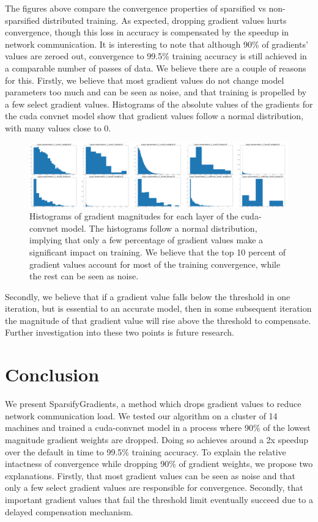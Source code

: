 \documentclass[10pt]{article}
\begin{document}
\noindent The figures above compare the convergence properties of
sparsified vs non-sparsified distributed training. As expected,
dropping gradient values hurts convergence, though this loss in
accuracy is compensated by the speedup in network communication. It is
interesting to note that although 90\% of gradients' values are zeroed
out, convergence to 99.5\% training accuracy is still achieved in a
comparable number of passes of data. We believe there are a couple of
reasons for this. Firstly, we believe that most gradient values do not
change model parameters too much and can be seen as noise, and that
training is propelled by a few select gradient values. Histograms of
the absolute values of the gradients for the cuda convnet model show
that gradient values follow a normal distribution, with many values
close to 0.

\begin{figure}[htb]
\centering
\includegraphics[width=.9\linewidth]{./figures/SparsifyHistogramOfGradientMagnitudes.png}
\caption{Histograms of gradient magnitudes for each layer of the cuda-convnet model. The histograms follow a normal distribution, implying that only a few percentage of gradient values make a significant impact on training. We believe that the top 10 percent of gradient values account for most of the training convergence, while the rest can be seen as noise.}
\end{figure}

\noindent Secondly, we believe that if a gradient value falls
below the threshold in one iteration, but is essential to an accurate
model, then in some subsequent iteration the magnitude of that
gradient value will rise above the threshold to compensate. Further
investigation into these two points is future research.

\section{Conclusion}
\label{sec-6}

We present SparsifyGradients, a method which drops gradient values to
reduce network communication load. We tested our algorithm on a
cluster of 14 machines and trained a cuda-convnet model in a process
where 90\% of the lowest magnitude gradient weights are dropped. Doing
so achieves around a 2x speedup over the default in time to 99.5\%
training accuracy. To explain the relative intactness of convergence
while dropping 90\% of gradient weights, we propose two
explanations. Firstly, that most gradient values can be seen as noise and
that only a few select gradient values are responsible for
convergence. Secondly, that important gradient values that fail the
threshold limit eventually succeed due to a delayed compensation
mechanism.
\end{document}
